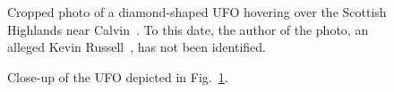 %
\begin{figure}[b]
\sidecaption
%
%
\caption{Cropped photo of a diamond-shaped UFO hovering over the Scottish Highlands near Calvin~\cite{AdamsCalvin20222Aug,ClarkeCalvin22}.
To this date, the author of the photo, an alleged Kevin Russell~\cite{YTDTMarch23}, has not been identified.}

\label{2023-UFO-part-History-photos-1990-calvin-c}       %
\end{figure}

%
\begin{figure}[b]
\sidecaption
%
%
\caption{Close-up of the UFO depicted in Fig.~\ref{2023-UFO-part-History-photos-1990-calvin-c}.}
\label{2023-UFO-part-History-photos-1990-calvin-cu}       %
\end{figure}


